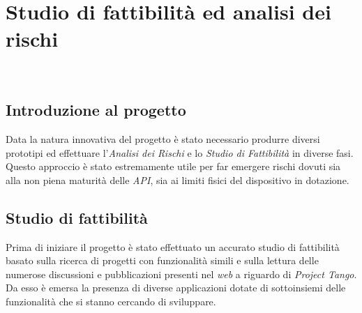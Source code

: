 
\chapter{Studio di fattibilità ed analisi dei rischi}
\label{cap:descrizione-stage}

\\

\section{Introduzione al progetto}
Data la natura innovativa del progetto è stato necessario produrre diversi prototipi ed effettuare l'\emph{Analisi dei Rischi} e lo \emph{Studio di Fattibilità} in diverse fasi.\\
Questo approccio è stato estremamente utile per far emergere rischi dovuti sia alla non piena maturità delle \emph{API}, sia ai limiti fisici del dispositivo in dotazione.

\section{Studio di fattibilità}
Prima di iniziare il progetto è stato effettuato un accurato studio di fattibilità basato sulla ricerca di progetti con funzionalità simili e sulla lettura delle numerose discussioni e pubblicazioni presenti nel \emph{web} a riguardo di \emph{Project Tango}.\\
Da esso è emersa la presenza di diverse applicazioni dotate di sottoinsiemi delle funzionalità che si stanno cercando di sviluppare.

